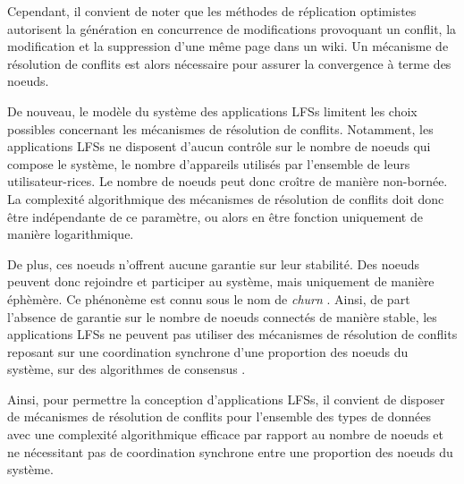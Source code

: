 Cependant, il convient de noter que les méthodes de réplication optimistes autorisent la génération en concurrence de modifications provoquant un conflit, \eg la modification et la suppression d'une même page dans un wiki.
Un mécanisme de résolution de conflits est alors nécessaire pour assurer la convergence à terme des noeuds.

De nouveau, le modèle du système des applications \acp{LFS} limitent les choix possibles concernant les mécanismes de résolution de conflits.
Notamment, les applications \acp{LFS} ne disposent d'aucun contrôle sur le nombre de noeuds qui compose le système, \ie le nombre d'appareils utilisés par l'ensemble de leurs utilisateur-rices.
Le nombre de noeuds peut donc croître de manière non-bornée.
La complexité algorithmique des mécanismes de résolution de conflits doit donc être indépendante de ce paramètre, ou alors en être fonction uniquement de manière logarithmique.

De plus, ces noeuds n'offrent aucune garantie sur leur stabilité.
Des noeuds peuvent donc rejoindre et participer au système, mais uniquement de manière éphèmère.
Ce phénonème est connu sous le nom de \emph{churn} \cite{understandingChurnP2PNetworks2006}.
Ainsi, de part l'absence de garantie sur le nombre de noeuds connectés de manière stable, les applications \acp{LFS} ne peuvent pas utiliser des mécanismes de résolution de conflits reposant sur une coordination synchrone d'une proportion des noeuds du système, \ie sur des algorithmes de consensus \cite{1998-paxos-lamport, 2014-raft-ongaro}.

Ainsi, pour permettre la conception d'applications \acp{LFS}, il convient de disposer de mécanismes de résolution de conflits pour l'ensemble des types de données avec une complexité algorithmique efficace par rapport au nombre de noeuds et ne nécessitant pas de coordination synchrone entre une proportion des noeuds du système.





